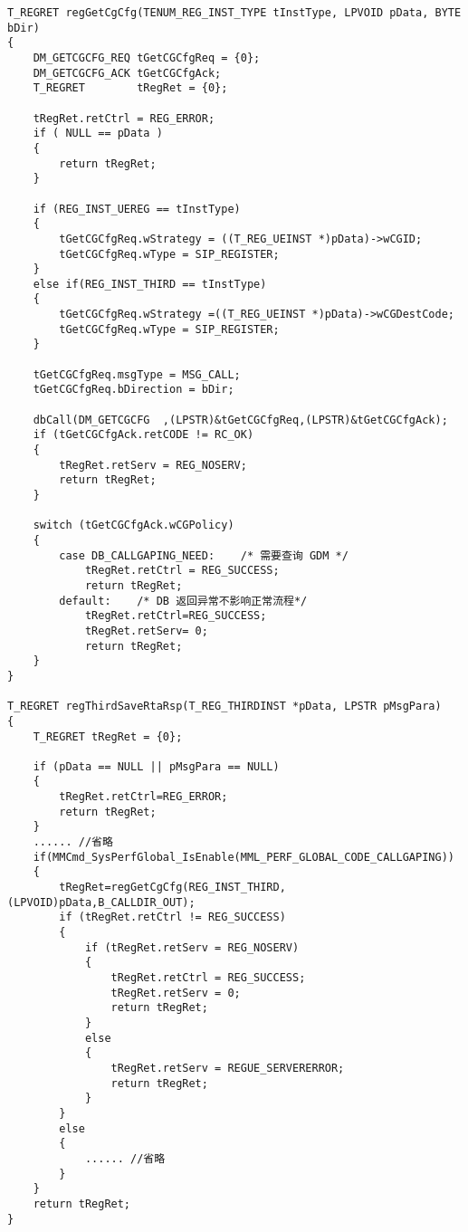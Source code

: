 ﻿\documentclass  [11pt,twocolumn]{article}
\begin{document}
\begin{lstlisting}
T_REGRET regGetCgCfg(TENUM_REG_INST_TYPE tInstType, LPVOID pData, BYTE bDir)
{
    DM_GETCGCFG_REQ tGetCGCfgReq = {0};
    DM_GETCGCFG_ACK tGetCGCfgAck; 
    T_REGRET        tRegRet = {0};

    tRegRet.retCtrl = REG_ERROR;
    if ( NULL == pData ) 
    {
        return tRegRet;
    }

    if (REG_INST_UEREG == tInstType) 
    {
        tGetCGCfgReq.wStrategy = ((T_REG_UEINST *)pData)->wCGID;
        tGetCGCfgReq.wType = SIP_REGISTER;
    }
    else if(REG_INST_THIRD == tInstType) 
    {
        tGetCGCfgReq.wStrategy =((T_REG_UEINST *)pData)->wCGDestCode;
        tGetCGCfgReq.wType = SIP_REGISTER;
    }

    tGetCGCfgReq.msgType = MSG_CALL;
    tGetCGCfgReq.bDirection = bDir;

    dbCall(DM_GETCGCFG  ,(LPSTR)&tGetCGCfgReq,(LPSTR)&tGetCGCfgAck);
    if (tGetCGCfgAck.retCODE != RC_OK) 
    {
        tRegRet.retServ = REG_NOSERV;
        return tRegRet;
    }

    switch (tGetCGCfgAck.wCGPolicy)
    {
        case DB_CALLGAPING_NEED:    /* 需要查询 GDM */
            tRegRet.retCtrl = REG_SUCCESS;
            return tRegRet;
        default:    /* DB 返回异常不影响正常流程*/
            tRegRet.retCtrl=REG_SUCCESS;
            tRegRet.retServ= 0;
            return tRegRet;
    }
}

T_REGRET regThirdSaveRtaRsp(T_REG_THIRDINST *pData, LPSTR pMsgPara)
{
    T_REGRET tRegRet = {0};

    if (pData == NULL || pMsgPara == NULL) 
    {
        tRegRet.retCtrl=REG_ERROR;
        return tRegRet;
    }
    ...... //省略
    if(MMCmd_SysPerfGlobal_IsEnable(MML_PERF_GLOBAL_CODE_CALLGAPING))
    {
        tRegRet=regGetCgCfg(REG_INST_THIRD,(LPVOID)pData,B_CALLDIR_OUT);
        if (tRegRet.retCtrl != REG_SUCCESS) 
        {
            if (tRegRet.retServ = REG_NOSERV) 
            {
                tRegRet.retCtrl = REG_SUCCESS;
                tRegRet.retServ = 0;
                return tRegRet;
            }
            else 
            {
                tRegRet.retServ = REGUE_SERVERERROR;
                return tRegRet;
            }
        }
        else 
        {
            ...... //省略
        }
    }
    return tRegRet;
}
\end{lstlisting}

\subsection{}
\end{document}
